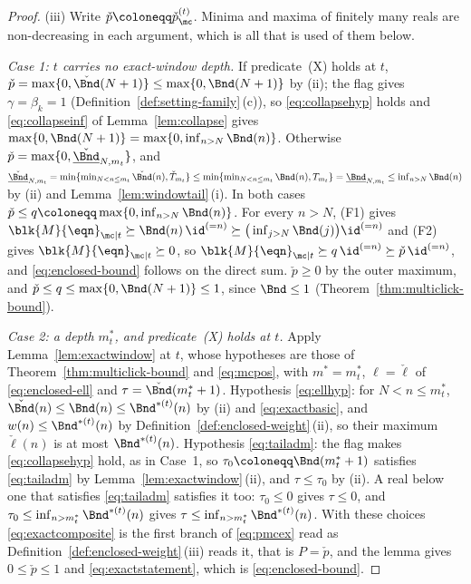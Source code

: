 \begin{proof}
(iii) Write $\check p\coloneqq\check p^{(t)}_{\mc}$. Minima and maxima of
finitely many reals are non-decreasing in each argument, which is all that is
used of them below.

\emph{Case 1: $t$ carries no exact-window depth.} If predicate~(X) holds at
$t$, $\check p=\max\{0,\check\Bnd(N+1)\}\le\max\{0,\Bnd(N+1)\}$ by (ii); the
flag gives $\gamma=\beta_k=1$ (Definition~\ref{def:setting-family}\,(c)), so
\eqref{eq:collapsehyp} holds and \eqref{eq:collapseinf} of
Lemma~\ref{lem:collapse} gives $\max\{0,\Bnd(N+1)\}=
\max\{0,\inf_{n>N}\Bnd(n)\}$. Otherwise
$\check p=\max\{0,\underline{\check\Bnd}_{N,m_t}\}$, and
$\underline{\check\Bnd}_{N,m_t}=\min\{\min_{N<n\le m_t}\check\Bnd(n),\check
T_{m_t}\}\le\min\{\min_{N<n\le m_t}\Bnd(n),T_{m_t}\}
=\underline{\Bnd}_{N,m_t}\le\inf_{n>N}\Bnd(n)$ by (ii) and
Lemma~\ref{lem:windowtail}\,(i). In both cases
$\check p\le q\coloneqq\max\{0,\inf_{n>N}\Bnd(n)\}$. For every $n>N$, (F1)
gives $\blk{M}{\eqn}_{\mc|t}\succeq\Bnd(n)\,\id^{(=n)}\succeq
\big(\inf_{j>N}\Bnd(j)\big)\id^{(=n)}$ and (F2) gives
$\blk{M}{\eqn}_{\mc|t}\succeq0$, so $\blk{M}{\eqn}_{\mc|t}\succeq q\,\id^{(=n)}
\succeq\check p\,\id^{(=n)}$, and \eqref{eq:enclosed-bound} follows on the
direct sum. $\check p\ge0$ by the outer maximum, and
$\check p\le q\le\max\{0,\Bnd(N+1)\}\le1$, since $\Bnd\le1$
(Theorem~\ref{thm:multiclick-bound}).

\emph{Case 2: a depth $m^{\ast}_t$, and predicate~(X) holds at $t$.} Apply
Lemma~\ref{lem:exactwindow} at $t$, whose hypotheses are those of
Theorem~\ref{thm:multiclick-bound} and \eqref{eq:mcpos}, with
$m^{\ast}=m^{\ast}_t$, $\ell=\check\ell$ of \eqref{eq:enclosed-ell} and
$\tau=\check\Bnd(m^{\ast}_t+1)$. Hypothesis \eqref{eq:ellhyp}: for
$N<n\le m^{\ast}_t$, $\check\Bnd(n)\le\Bnd(n)\le\Bnd^{\ast(t)}(n)$ by (ii) and
\eqref{eq:exactbasic}, and $w(n)\le\Bnd^{\ast(t)}(n)$ by
Definition~\ref{def:enclosed-weight}\,(ii), so their maximum $\check\ell(n)$
is at most $\Bnd^{\ast(t)}(n)$. Hypothesis \eqref{eq:tailadm}: the flag makes
\eqref{eq:collapsehyp} hold, as in Case~1, so
$\tau_0\coloneqq\Bnd(m^{\ast}_t+1)$ satisfies \eqref{eq:tailadm} by
Lemma~\ref{lem:exactwindow}\,(ii), and $\tau\le\tau_0$ by (ii). A real below
one that satisfies \eqref{eq:tailadm} satisfies it too: $\tau_0\le0$ gives
$\tau\le0$, and $\tau_0\le\inf_{n>m^{\ast}_t}\Bnd^{\ast(t)}(n)$ gives
$\tau\le\inf_{n>m^{\ast}_t}\Bnd^{\ast(t)}(n)$. With these choices
\eqref{eq:exactcomposite} is the first branch of \eqref{eq:pmcex} read as
Definition~\ref{def:enclosed-weight}\,(iii) reads it, that is $P=\check p$,
and the lemma gives $0\le\check p\le1$ and \eqref{eq:exactstatement}, which is
\eqref{eq:enclosed-bound}.


\end{proof}
